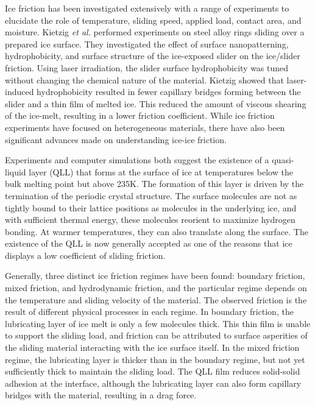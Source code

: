\documentclass[journal = jpccck, manuscript = article]{achemso}
\begin{document}
Ice friction has been investigated extensively with a range
of experiments to elucidate the role of
temperature,\cite{Bowden1939,Evans1976,Roberts1981,Derjaguin1988,Liang2003,Higgins2008} sliding speed,\cite{Evans1976,Derjaguin1988,Liang2003} applied
load,\cite{Bowden1939,Oksanen1982,Derjaguin1988,Buhl2001,Baurle2006}
contact area,\cite{Bowden1939,Baurle2007} and
moisture.\cite{Calabrese1980} Kietzig \textit{et al.} performed
experiments on steel alloy rings sliding over a prepared ice
surface.\cite{Kietzig2009} They investigated the effect of surface
nanopatterning, hydrophobicity, and surface structure of the
ice-exposed slider on the ice/slider friction.
Using laser irradiation, the slider surface hydrophobicity was tuned
without changing the chemical nature of the material. Kietzig showed
that laser-induced hydrophobicity resulted in fewer capillary bridges
forming between the slider and a thin film of melted ice. This reduced
the amount of viscous shearing of the ice-melt, resulting in a lower
friction coefficient.
While ice friction experiments have focused on heterogeneous
materials,\cite{Bowden1939,Evans1976,Derjaguin1988,Liang2003,Liang2005,Baurle2006,Baurle2007,Kietzig2009,Kietzig2010}
there have also been significant advances made on understanding
ice-ice
friction.\cite{Oksanen1982,Kennedy2000,Maeno2004,Fortt2007,Fortt2011,Lishman2011,Samadashvili2013}

Experiments and computer simulations both suggest the existence of a
quasi-liquid layer (QLL) that forms at the surface of ice at
temperatures below the bulk melting point but above
235K.\cite{Kroes1992,Ikeda-Fukazawa2004,Picaud2006,Conde2008,Bartels-Rausch2014,Sancheza2017}
The formation of this layer is driven by the termination of the
periodic crystal structure. The surface molecules are not as tightly
bound to their lattice positions as molecules in the underlying ice,
and with sufficient thermal energy, these molecules reorient to
maximize hydrogen bonding. At warmer temperatures, they can also
translate along the surface.\cite{Pfalzgraff2011,Bartels-Rausch2014}
The existence of the QLL is now generally accepted as one of the
reasons that ice displays a low coefficient of sliding
friction.\cite{Dash1995,Rosenberg2005,Dash2006,Malenkov2009}

Generally, three distinct ice friction regimes have been found:
boundary friction, mixed friction, and hydrodynamic friction, and the
particular regime depends on the temperature and sliding velocity of
the
material.\cite{Bhushan2002,Kietzig2009,Kietzig2010,Persson2015,Tuononen2016}
The observed friction is the result of different physical processes in
each regime. In boundary friction, the lubricating layer of ice melt
is only a few molecules thick. This thin film is unable to support the
sliding load, and friction can be attributed to surface asperities of
the sliding material interacting with the ice surface
itself.\cite{Bhushan2002} In the mixed friction regime, the
lubricating layer is thicker than in the boundary regime, but not yet
sufficiently thick to maintain the sliding load. The QLL film reduces
solid-solid adhesion at the interface, although the lubricating layer
can also form capillary bridges with the material, resulting in a drag
force.\cite{Kietzig2009,Kietzig2010}
\end{document}
